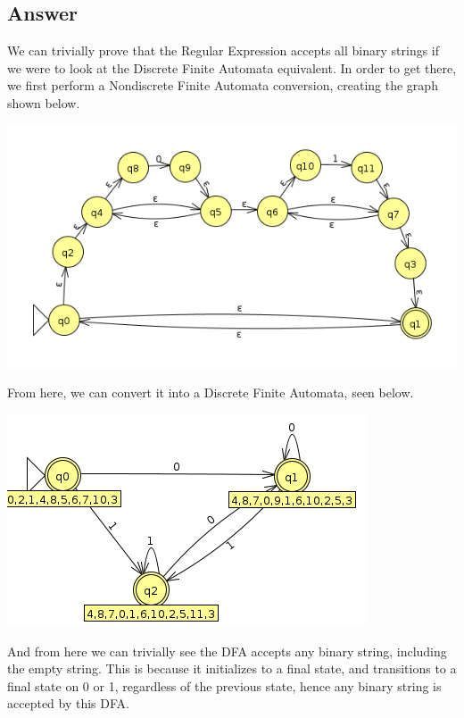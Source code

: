 \documentclass[12pt, a4paper]{article}
\begin{document}
\subsection{Answer}
We can trivially prove that the Regular Expression accepts all binary strings if we were to look at the Discrete Finite Automata equivalent. In order to get there, we first perform a Nondiscrete Finite Automata  conversion, creating the graph shown below.
\begin{center}
\includegraphics[scale=0.5]{2.15NFA}
\end{center}
From here, we can convert it into a Discrete Finite Automata, seen below.
\begin{center}
\includegraphics[scale=0.5]{2.15DFA}
\end{center}
And from here we can trivially see the DFA accepts any binary string, including the empty string. This is because it initializes to a final state, and transitions to a final state on 0 or 1, regardless of the previous state, hence any binary string is accepted by this DFA.
\end{document}
